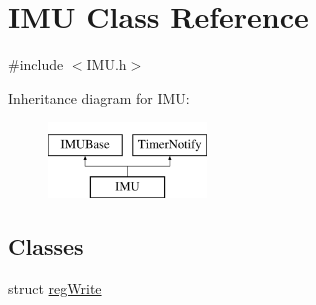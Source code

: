 \hypertarget{class_i_m_u}{
\section{IMU Class Reference}
\label{class_i_m_u}
}


{\ttfamily \#include $<$IMU.h$>$}

Inheritance diagram for IMU:\begin{figure}[H]
\begin{center}
\leavevmode
\includegraphics[height=2.000000cm]{class_i_m_u}
\end{center}
\end{figure}
\subsection*{Classes}
\begin{DoxyCompactItemize}
\item 
struct \hyperlink{struct_i_m_u_1_1reg_write}{regWrite}
\end{DoxyCompactItemize}
